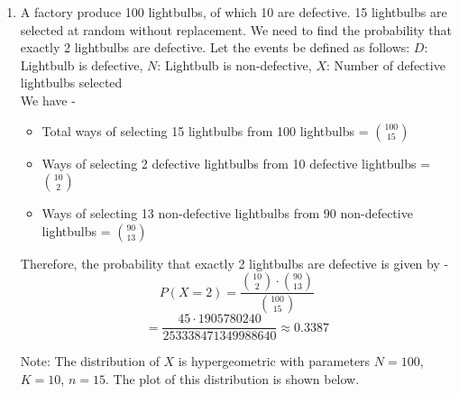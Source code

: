 \begin{enumerate}
\begin{itemize}
        \[P(E) = \binom{2N - r - 1}{N} p^N q^{N-r-1} + \binom{2N - r - 1}{N} q^N p^{N-r-1}\]
        \[\boxed{= \binom{2N - r - 1}{N} \left(p^N q^{N-r-1} + q^N p^{N-r-1}\right)
        }\]
    \end{itemize}
    \item A factory produce 100 lightbulbs, of which 10 are defective. 15 lightbulbs are selected at random without replacement. We need to find the probability that exactly 2 lightbulbs are defective. Let the events be defined as follows:
    $D$: Lightbulb is defective,
    $N$: Lightbulb is non-defective,
    $X$: Number of defective lightbulbs selected \\ 
    We have -
    \begin{itemize}
        \item Total ways of selecting 15 lightbulbs from 100 lightbulbs = $\binom{100}{15}$
        \item Ways of selecting 2 defective lightbulbs from 10 defective lightbulbs = $\binom{10}{2}$
        \item Ways of selecting 13 non-defective lightbulbs from 90 non-defective lightbulbs = $\binom{90}{13}$
    \end{itemize}
    Therefore, the probability that exactly 2 lightbulbs are defective is given by -
    \[P(X = 2) = \frac{\binom{10}{2} \cdot \binom{90}{13}}{\binom{100}{15}}\]
    \[\boxed{= \frac{45 \cdot 1905780240}{253338471349988640} \approx 0.3387
    }\]
    \begin{mynote}
    Note: The distribution of $X$ is hypergeometric with parameters $N = 100$, $K = 10$, $n = 15$. The plot of this distribution is shown below.
    \begin{figure}[H]
        \centering
\end{figure}
\end{mynote}
\end{enumerate}

